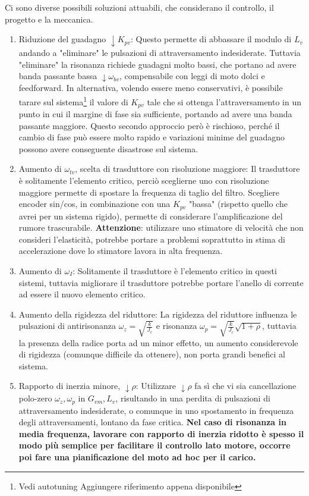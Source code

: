 Ci sono diverse possibili soluzioni attuabili, che considerano il controllo, il progetto e la meccanica.
\begin{enumerate}[label=\roman*.]
    \item Riduzione del guadagno \(\downarrow K_{pv}\): Questo permette di abbassare il modulo di \(L_v\) andando a "eliminare" le pulsazioni di attraversamento indesiderate. Tuttavia "eliminare" la risonanza richiede guadagni molto bassi, che portano ad avere banda passante bassa \(\downarrow \omega_{bv}\), compensabile con leggi di moto dolci e feedforward.
    In alternativa, volendo essere meno conservativi, è possibile tarare sul sistema\footnote{Vedi autotuning {\color{red} Aggiungere riferimento appena disponibile}} il valore di \(K_{pv}\) tale che si ottenga l'attraversamento in un punto in cui il margine di fase sia sufficiente, portando ad avere una banda passante maggiore. Questo secondo approccio però è rischioso, perché il cambio di fase può essere molto rapido e variazioni minime del guadagno possono avere conseguente disastrose sul sistema.
    \item Aumento di \(\omega_{tv}\), scelta di trasduttore con risoluzione maggiore: Il trasduttore è solitamente l'elemento critico, perciò sceglierne uno con risoluzione maggiore permette di spostare la frequenza di taglio del filtro. Scegliere encoder sin/cos, in combinazione con una \(K_{pv}\) "bassa" (rispetto quello che avrei per un sistema rigido), permette di considerare l'amplificazione del rumore trascurabile.
    \textbf{Attenzione}: utilizzare uno stimatore di velocità che non consideri l'elasticità, potrebbe portare a problemi soprattutto in stima di accelerazione dove lo stimatore lavora in alta frequenza.
    \item Aumento di \(\omega_I\): Solitamente il trasduttore è l'elemento critico in questi sistemi, tuttavia migliorare il trasduttore potrebbe portare l'anello di corrente ad essere il nuovo elemento critico.
    \item Aumento della rigidezza del riduttore: La rigidezza del riduttore influenza le pulsazioni di antirisonanza \(\omega_z = \sqrt{\frac{k}{J_c}}\) e risonanza \(\omega_p = \sqrt{\frac{k}{J_c}}\sqrt{1+\rho}\), tuttavia la presenza della radice porta ad un minor effetto, un aumento considerevole di rigidezza (comunque difficile da ottenere), non porta grandi benefici al sistema. 
    \item Rapporto di inerzia minore, \(\downarrow \rho\): Utilizzare \(\downarrow \rho\) fa sì che vi sia cancellazione polo-zero \(\omega_z,\omega_p\) in \(G_{vm}, L_v\), risultando in una perdita di pulsazioni di attraversamento indesiderate, o comunque in uno spostamento in frequenza degli attraversamenti, lontano da fase critica. \textbf{Nel caso di risonanza in media frequenza, lavorare con rapporto di inerzia ridotto è spesso il modo più semplice per facilitare il controllo lato motore, occorre poi fare una pianificazione del moto ad hoc per il carico.}

\end{enumerate}
